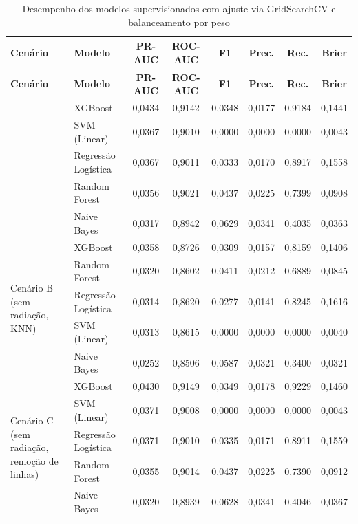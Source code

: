 \begin{longtable}{p{3.2cm} l c c c c c c}
\caption{Desempenho dos modelos supervisionados com ajuste via GridSearchCV e balanceamento por peso}
\label{tab:resultados_grid_pesos} \\
\toprule
\textbf{Cenário} & \textbf{Modelo} & \textbf{PR-AUC} & \textbf{ROC-AUC} & \textbf{F1} & \textbf{Prec.} & \textbf{Rec.} & \textbf{Brier} \\
\midrule
\endfirsthead

\toprule
\textbf{Cenário} & \textbf{Modelo} & \textbf{PR-AUC} & \textbf{ROC-AUC} & \textbf{F1} & \textbf{Prec.} & \textbf{Rec.} & \textbf{Brier} \\
\midrule
\endhead

\bottomrule
\endfoot

\bottomrule
\endlastfoot

\multirow{5}{*}{\parbox{3.2cm}{\centering Cenário A\\(sem radiação)}} 
   & XGBoost             & 0,0434 & 0,9142 & 0,0348 & 0,0177 & 0,9184 & 0,1441 \\
   & SVM (Linear)        & 0,0367 & 0,9010 & 0,0000 & 0,0000 & 0,0000 & 0,0043 \\
   & Regressão Logística & 0,0367 & 0,9011 & 0,0333 & 0,0170 & 0,8917 & 0,1558 \\
   & Random Forest       & 0,0356 & 0,9021 & 0,0437 & 0,0225 & 0,7399 & 0,0908 \\
   & Naive Bayes         & 0,0317 & 0,8942 & 0,0629 & 0,0341 & 0,4035 & 0,0363 \\
\midrule

\multirow{5}{*}{\parbox{3.2cm}{\centering Cenário B\\(sem radiação, KNN)}} 
   & XGBoost             & 0,0358 & 0,8726 & 0,0309 & 0,0157 & 0,8159 & 0,1406 \\
   & Random Forest       & 0,0320 & 0,8602 & 0,0411 & 0,0212 & 0,6889 & 0,0845 \\
   & Regressão Logística & 0,0314 & 0,8620 & 0,0277 & 0,0141 & 0,8245 & 0,1616 \\
   & SVM (Linear)        & 0,0313 & 0,8615 & 0,0000 & 0,0000 & 0,0000 & 0,0040 \\
   & Naive Bayes         & 0,0252 & 0,8506 & 0,0587 & 0,0321 & 0,3400 & 0,0321 \\
\midrule

\multirow{5}{*}{\parbox{3.2cm}{\centering Cenário C\\(sem radiação, remoção de linhas)}} 
   & XGBoost             & 0,0430 & 0,9149 & 0,0349 & 0,0178 & 0,9229 & 0,1460 \\
   & SVM (Linear)        & 0,0371 & 0,9008 & 0,0000 & 0,0000 & 0,0000 & 0,0043 \\
   & Regressão Logística & 0,0371 & 0,9010 & 0,0335 & 0,0171 & 0,8911 & 0,1559 \\
   & Random Forest       & 0,0355 & 0,9014 & 0,0437 & 0,0225 & 0,7390 & 0,0912 \\
   & Naive Bayes         & 0,0320 & 0,8939 & 0,0628 & 0,0341 & 0,4046 & 0,0367 \\
\midrule


\end{longtable}

